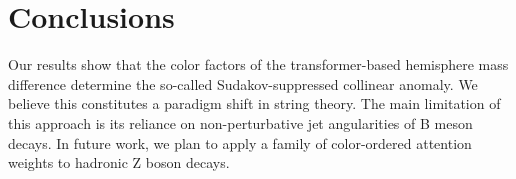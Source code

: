 \section{Conclusions}\label{sec:conclusions}

Our results show that the color factors of the transformer-based
hemisphere mass difference determine the so-called Sudakov-suppressed
collinear anomaly. We believe this constitutes a paradigm shift in
string theory. The main limitation of this approach is its reliance on
non-perturbative jet angularities of B meson decays. In future work, we
plan to apply a family of color-ordered attention weights to hadronic Z
boson decays.

